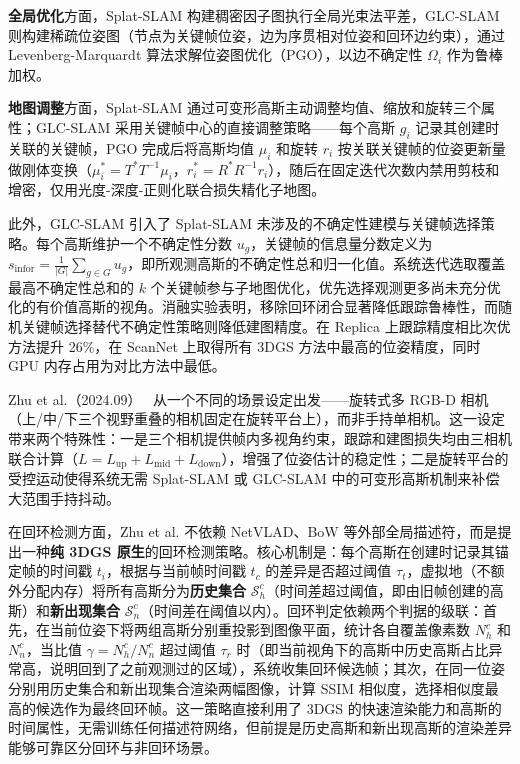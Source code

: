 \textbf{全局优化}方面，Splat-SLAM 构建稠密因子图执行全局光束法平差，GLC-SLAM 则构建稀疏位姿图（节点为关键帧位姿，边为序贯相对位姿和回环边约束），通过 Levenberg-Marquardt 算法求解位姿图优化（PGO），以边不确定性 $\Omega_i$ 作为鲁棒加权。

\textbf{地图调整}方面，Splat-SLAM 通过可变形高斯主动调整均值、缩放和旋转三个属性；GLC-SLAM 采用关键帧中心的直接调整策略——每个高斯 $g_i$ 记录其创建时关联的关键帧，PGO 完成后将高斯均值 $\mu_i$ 和旋转 $r_i$ 按关联关键帧的位姿更新量做刚体变换（$\mu_i^* = T^* T^{-1} \mu_i$，$r_i^* = R^* R^{-1} r_i$），随后在固定迭代次数内禁用剪枝和增密，仅用光度-深度-正则化联合损失精化子地图。

此外，GLC-SLAM 引入了 Splat-SLAM 未涉及的不确定性建模与关键帧选择策略。每个高斯维护一个不确定性分数 $u_g$，关键帧的信息量分数定义为 $s_{\mathrm{infor}} = \frac{1}{|G|}\sum_{g \in G} u_g$，即所观测高斯的不确定性总和归一化值。系统迭代选取覆盖最高不确定性总和的 $k$ 个关键帧参与子地图优化，优先选择观测更多尚未充分优化的有价值高斯的视角。消融实验表明，移除回环闭合显著降低跟踪鲁棒性，而随机关键帧选择替代不确定性策略则降低建图精度。在 Replica 上跟踪精度相比次优方法提升 26\%，在 ScanNet 上取得所有 3DGS 方法中最高的位姿精度，同时 GPU 内存占用为对比方法中最低。

Zhu et al.（2024.09）~\cite{2409_20111} 从一个不同的场景设定出发——旋转式多 RGB-D 相机（上/中/下三个视野重叠的相机固定在旋转平台上），而非手持单相机。这一设定带来两个特殊性：一是三个相机提供帧内多视角约束，跟踪和建图损失均由三相机联合计算（$L = L_{\mathrm{up}} + L_{\mathrm{mid}} + L_{\mathrm{down}}$），增强了位姿估计的稳定性；二是旋转平台的受控运动使得系统无需 Splat-SLAM 或 GLC-SLAM 中的可变形高斯机制来补偿大范围手持抖动。

在回环检测方面，Zhu et al. 不依赖 NetVLAD、BoW 等外部全局描述符，而是提出一种\textbf{纯 3DGS 原生}的回环检测策略。核心机制是：每个高斯在创建时记录其锚定帧的时间戳 $t_i$，根据与当前帧时间戳 $t_c$ 的差异是否超过阈值 $\tau_t$，虚拟地（不额外分配内存）将所有高斯分为\textbf{历史集合} $\mathcal{S}_h^c$（时间差超过阈值，即由旧帧创建的高斯）和\textbf{新出现集合} $\mathcal{S}_n^c$（时间差在阈值以内）。回环判定依赖两个判据的级联：首先，在当前位姿下将两组高斯分别重投影到图像平面，统计各自覆盖像素数 $N_h^c$ 和 $N_n^c$，当比值 $\gamma = N_h^c / N_n^c$ 超过阈值 $\tau_r$ 时（即当前视角下的高斯中历史高斯占比异常高，说明回到了之前观测过的区域），系统收集回环候选帧；其次，在同一位姿分别用历史集合和新出现集合渲染两幅图像，计算 SSIM 相似度，选择相似度最高的候选作为最终回环帧。这一策略直接利用了 3DGS 的快速渲染能力和高斯的时间属性，无需训练任何描述符网络，但前提是历史高斯和新出现高斯的渲染差异能够可靠区分回环与非回环场景。

